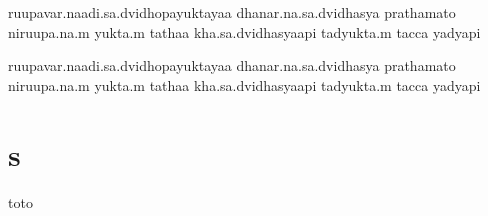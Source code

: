 \documentclass{article}
\begin{document}
\beginnumbering
{}

\pstart
ruupavar.naadi.sa.dvidhopayuktayaa dhanar.na.sa.dvidhasya prathamato
niruupa.na.m yukta.m tathaa kha.sa.dvidhasyaapi tadyukta.m tacca
yadyapi
\pend

\pstart[\section*{s}]
ruupavar.naadi.sa.dvidhopayuktayaa dhanar.na.sa.dvidhasya prathamato
niruupa.na.m yukta.m tathaa kha.sa.dvidhasyaapi tadyukta.m tacca
yadyapi

\pend


\endnumbering

\section{s}
toto
\end{document}

